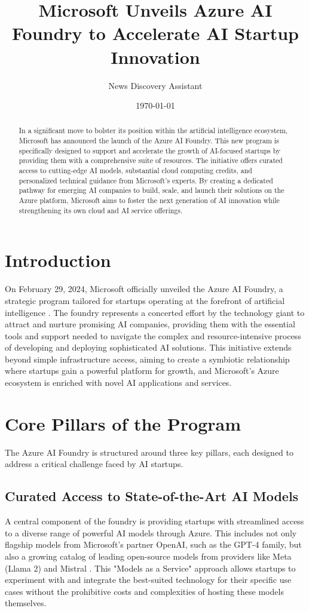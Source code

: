 \documentclass[11pt, a4paper]{article}
\title{\textbf{Microsoft Unveils Azure AI Foundry to Accelerate AI Startup Innovation}}
\author{News Discovery Assistant}
\affil{AI Research and Synthesis Division}
\date{\today}
\begin{document}
\maketitle

\begin{abstract}
\noindent In a significant move to bolster its position within the artificial intelligence ecosystem, Microsoft has announced the launch of the Azure AI Foundry. This new program is specifically designed to support and accelerate the growth of AI-focused startups by providing them with a comprehensive suite of resources. The initiative offers curated access to cutting-edge AI models, substantial cloud computing credits, and personalized technical guidance from Microsoft's experts. By creating a dedicated pathway for emerging AI companies to build, scale, and launch their solutions on the Azure platform, Microsoft aims to foster the next generation of AI innovation while strengthening its own cloud and AI service offerings.
\end{abstract}

\section{Introduction}
On February 29, 2024, Microsoft officially unveiled the Azure AI Foundry, a strategic program tailored for startups operating at the forefront of artificial intelligence \cite{microsoft_blog}. The foundry represents a concerted effort by the technology giant to attract and nurture promising AI companies, providing them with the essential tools and support needed to navigate the complex and resource-intensive process of developing and deploying sophisticated AI solutions. This initiative extends beyond simple infrastructure access, aiming to create a symbiotic relationship where startups gain a powerful platform for growth, and Microsoft's Azure ecosystem is enriched with novel AI applications and services.

\section{Core Pillars of the Program}
The Azure AI Foundry is structured around three key pillars, each designed to address a critical challenge faced by AI startups.

\subsection{Curated Access to State-of-the-Art AI Models}
A central component of the foundry is providing startups with streamlined access to a diverse range of powerful AI models through Azure. This includes not only flagship models from Microsoft's partner OpenAI, such as the GPT-4 family, but also a growing catalog of leading open-source models from providers like Meta (Llama 2) and Mistral \cite{techcrunch}. This "Models as a Service" approach allows startups to experiment with and integrate the best-suited technology for their specific use cases without the prohibitive costs and complexities of hosting these models themselves.
\end{document}
